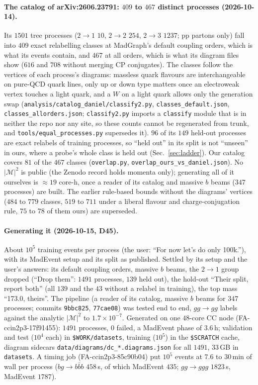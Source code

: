 \documentclass[11pt]{article}
\newcommand{\code}[1]{\texttt{#1}}
\begin{document}
\paragraph{The catalog of arXiv:2606.23791: $409$ to $467$ distinct processes (2026-10-14).} Its $1501$ tree
processes ($2\to1$ $10$, $2\to2$ $254$, $2\to3$ $1237$; pp partons only) fall into $409$ exact relabelling classes at
MadGraph's default coupling orders, which is what its events contain, and $467$ at all orders, which is what its
diagram files show ($616$ and $708$ without merging CP conjugates). The classes follow the vertices of each process's
diagrams: massless quark flavours are interchangeable on pure-QCD quark lines, only up or down type matters once an
electroweak vertex touches a light quark, and a $W$ on a light quark allows only the generation swap
(\code{analysis/catalog\_daniel/classify2.py}, \code{classes\_default.json}, \code{classes\_allorders.json}; \code{classify2.py}
imports a \code{classify} module that is in neither the repo nor any site, so these counts cannot be regenerated from
trunk, and \code{tools/equal\_processes.py} supersedes it). $96$ of
its $149$ held-out processes are exact relabels of training processes, so ``held out'' in its split is not
``unseen'' in ours, where a probe's whole class is held out (Sec.~\ref{sec:ladder}). Our catalog covers $81$ of the
$467$ classes (\code{overlap.py}, \code{overlap\_ours\_vs\_daniel.json}). No $|\mathcal M|^2$ is public (the Zenodo record
holds momenta only); generating all of it ourselves is $\approx19$ core-h, once a reader of its catalog and massive
$b$ beams ($347$ processes) are built. The earlier rule-based bounds without the diagrams' vertices ($484$ to $779$
classes, $519$ to $711$ under a liberal flavour and charge-conjugation rule, $75$ to $78$ of them ours) are superseded.

\paragraph{Generating it (2026-10-15, D45).} About $10^5$ training events per process (the user: ``For now let's do only
100k.''), with its MadEvent setup and its split as published. Settled by its setup and the user's answers: its default
coupling orders, massive $b$ beams, the $2\to1$ group dropped (``Drop them'': $1491$ processes, $139$ held out), the
hold-out ``Their split, report both'' (all $139$ and the $43$ without a relabel in training), the top mass ``173.0,
theirs''. The pipeline (a reader of its catalog, massive $b$ beams for $347$ processes; commits \code{9bbc825},
\code{77cae08}) was tested end to end, $gg\to gg$ labels against the analytic $|\mathcal M|^2$ to $1.7\times10^{-7}$.
Generated on one $48$-core CC node (FA-ccin2p3-17f91455): $1491$ processes, $0$ failed, a MadEvent phase of $3.6$\,h;
validation and test ($10^4$ each) in \code{\$WORK/datasets}, training ($10^5$) in the \code{\$SCRATCH} cache, diagram
sidecars \code{data/diagrams/dc\_*.diagrams.json} for all $1491$, $33$\,GB in \code{datasets}. A timing job
(FA-ccin2p3-85c90b04) put $10^5$ events at $7.6$ to $30$\,min of wall per process ($b g\to b\bar b b$ $458$\,s, of which
MadEvent $435$; $gg\to ggg$ $1823$\,s, MadEvent $1787$).
\end{document}
